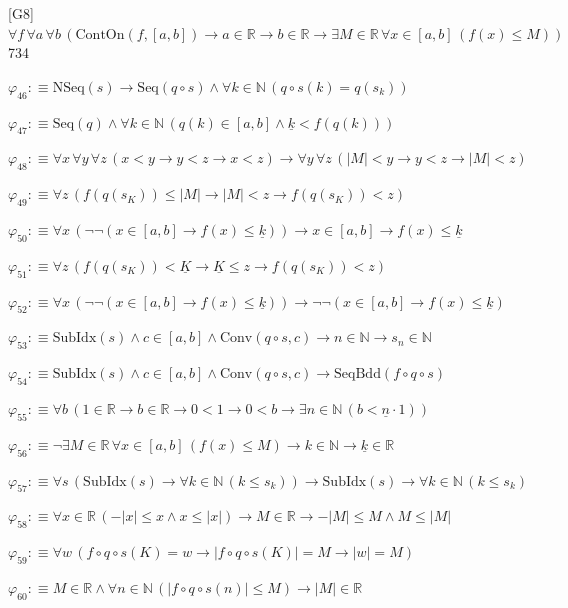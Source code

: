 \begin{fullproof}{[G8]}{$\forall f\,\forall a\,\forall b\,(\mathrm{ContOn}(f,[a,b]) \to a \in \mathbb{R} \to b \in \mathbb{R} \to \exists M \in \mathbb{R}\,\forall x \in [a,b]\,(f(x) \leq M))$}{734}
\begin{abbrevlist}
\item $\varphi_{46} :\equiv \mathrm{NSeq}(s) \to \mathrm{Seq}(q \circ s) \land \forall k \in \mathbb{N}\,(q \circ s(k) = q(s_{k}))$
\item $\varphi_{47} :\equiv \mathrm{Seq}(q) \land \forall k \in \mathbb{N}\,(q(k) \in [a,b] \land \underline{k} < f(q(k)))$
\item $\varphi_{48} :\equiv \forall x\,\forall y\,\forall z\,(x < y \to y < z \to x < z) \to \forall y\,\forall z\,(\lvert M \rvert < y \to y < z \to \lvert M \rvert < z)$
\item $\varphi_{49} :\equiv \forall z\,(f(q(s_{K})) \leq \lvert M \rvert \to \lvert M \rvert < z \to f(q(s_{K})) < z)$
\item $\varphi_{50} :\equiv \forall x\,(\neg \neg (x \in [a,b] \to f(x) \leq \underline{k})) \to x \in [a,b] \to f(x) \leq \underline{k}$
\item $\varphi_{51} :\equiv \forall z\,(f(q(s_{K})) < \underline{K} \to \underline{K} \leq z \to f(q(s_{K})) < z)$
\item $\varphi_{52} :\equiv \forall x\,(\neg \neg (x \in [a,b] \to f(x) \leq \underline{k})) \to \neg \neg (x \in [a,b] \to f(x) \leq \underline{k})$
\item $\varphi_{53} :\equiv \mathrm{SubIdx}(s) \land c \in [a,b] \land \mathrm{Conv}(q \circ s,c) \to n \in \mathbb{N} \to s_{n} \in \mathbb{N}$
\item $\varphi_{54} :\equiv \mathrm{SubIdx}(s) \land c \in [a,b] \land \mathrm{Conv}(q \circ s,c) \to \mathrm{SeqBdd}(f \circ q \circ s)$
\item $\varphi_{55} :\equiv \forall b\,(1 \in \mathbb{R} \to b \in \mathbb{R} \to 0 < 1 \to 0 < b \to \exists n \in \mathbb{N}\,(b < \underline{n} \cdot 1))$
\item $\varphi_{56} :\equiv \neg \exists M \in \mathbb{R}\,\forall x \in [a,b]\,(f(x) \leq M) \to k \in \mathbb{N} \to \underline{k} \in \mathbb{R}$
\item $\varphi_{57} :\equiv \forall s\,(\mathrm{SubIdx}(s) \to \forall k \in \mathbb{N}\,(k \leq s_{k})) \to \mathrm{SubIdx}(s) \to \forall k \in \mathbb{N}\,(k \leq s_{k})$
\item $\varphi_{58} :\equiv \forall x \in \mathbb{R}\,(-\lvert x \rvert \leq x \land x \leq \lvert x \rvert) \to M \in \mathbb{R} \to -\lvert M \rvert \leq M \land M \leq \lvert M \rvert$
\item $\varphi_{59} :\equiv \forall w\,(f \circ q \circ s(K) = w \to \lvert f \circ q \circ s(K) \rvert = M \to \lvert w \rvert = M)$
\item $\varphi_{60} :\equiv M \in \mathbb{R} \land \forall n \in \mathbb{N}\,(\lvert f \circ q \circ s(n) \rvert \leq M) \to \lvert M \rvert \in \mathbb{R}$

\end{abbrevlist}
\end{fullproof}
